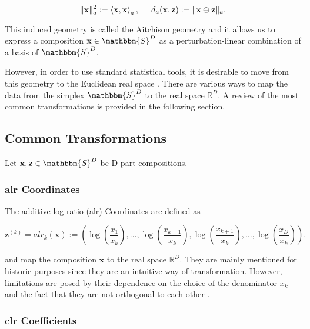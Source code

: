 \begin{equation*}
\lVert\textbf{x}\rVert_a^2 := \left\langle  \textbf{x},\textbf{x} \right\rangle_a, \hspace{0.5cm} d_a(\textbf{x},\textbf{z}) := \lVert\textbf{x} \ominus \textbf{z}\rVert_a .
\label{eq:Simplex Norm and Distance}
\end{equation*}

This induced geometry is called the Aitchison geometry and it allows us to express a composition $\textbf{x} \in \mathbbm{S}^D$ as a perturbation-linear combination of a basis of $\mathbbm{S}^D$.

However, in order to use standard statistical tools, it is desirable to move from this geometry to the Euclidean real space \cite{Filzmoser:2020}. There are various ways to map the data from the simplex $\mathbbm{S}^D$ to the real space $\mathbb{R}^D$. A review of the most common transformations is provided in the following section.

\subsection{Common Transformations}
\label{sec: Common Transformations}

Let $\textbf{x}, \textbf{z} \in \mathbbm{S}^D$ be D-part compositions.
\subsubsection{alr Coordinates}
\label{sec:alr Coordinates}

The additive log-ratio (alr) Coordinates are defined as

\begin{equation*}
\textbf{z}^{(k)} = alr_k(\textbf{x}) := \left(\log\left(\frac{x_1}{x_k}\right), \ldots, \log\left(\frac{x_{k-1}}{x_k}\right),\log\left(\frac{x_{k+1}}{x_k}\right),\ldots,\log\left(\frac{x_D}{x_k}\right)\right).
\label{eq:alr Coordinates}
\end{equation*}

and map the composition $\textbf{x}$ to the real space $\mathbb{R}^D$. They are mainly mentioned for historic purposes since they are an intuitive way of transformation. However, limitations are posed by their dependence on the choice of the denominator $x_k$ and the fact that they are not orthogonal to each other \cite{Filzmoser:2020}. 

\subsubsection{clr Coefficients}
\label{sec:clr Coefficients}

